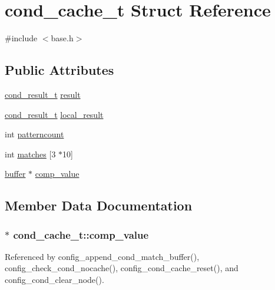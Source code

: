 \hypertarget{structcond__cache__t}{\section{cond\-\_\-cache\-\_\-t Struct Reference}
\label{structcond__cache__t}
}


{\ttfamily \#include $<$base.\-h$>$}

\subsection*{Public Attributes}
\begin{DoxyCompactItemize}
\item 
\hyperlink{base_8h_a842aa102e2ce2846d02dce7b547a031c}{cond\-\_\-result\-\_\-t} \hyperlink{structcond__cache__t_a2102a66d0a72126a6dba43d13c067d29}{result}
\item 
\hyperlink{base_8h_a842aa102e2ce2846d02dce7b547a031c}{cond\-\_\-result\-\_\-t} \hyperlink{structcond__cache__t_a9440c923dcf44190cf5aa9eaa89fa685}{local\-\_\-result}
\item 
int \hyperlink{structcond__cache__t_a5400d839ef7de66f5b61f2fc8130c8ca}{patterncount}
\item 
int \hyperlink{structcond__cache__t_a9ff6f9f4f11a06b34fdc0160990d5f72}{matches} \mbox{[}3 $\ast$10\mbox{]}
\item 
\hyperlink{structbuffer}{buffer} $\ast$ \hyperlink{structcond__cache__t_a39b15883444a827fb7100ee69cd7e3fa}{comp\-\_\-value}
\end{DoxyCompactItemize}


\subsection{Member Data Documentation}
\hypertarget{structcond__cache__t_a39b15883444a827fb7100ee69cd7e3fa}{
\subsubsection[{comp\-\_\-value}]{$\ast$ cond\-\_\-cache\-\_\-t\-::comp\-\_\-value}}\label{structcond__cache__t_a39b15883444a827fb7100ee69cd7e3fa}


Referenced by config\-\_\-append\-\_\-cond\-\_\-match\-\_\-buffer(), config\-\_\-check\-\_\-cond\-\_\-nocache(), config\-\_\-cond\-\_\-cache\-\_\-reset(), and config\-\_\-cond\-\_\-clear\-\_\-node().

